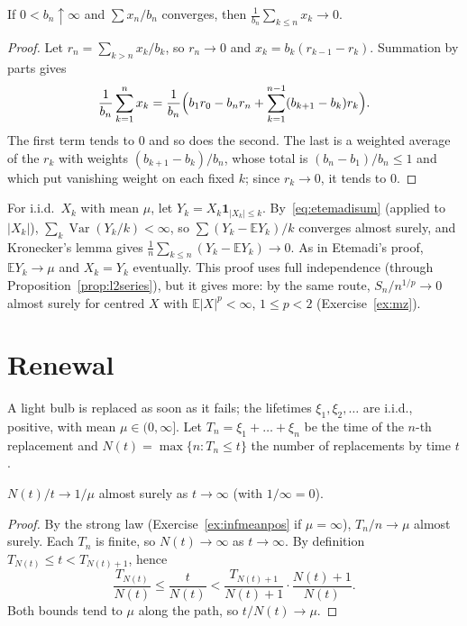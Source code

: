 \begin{lemma}[Kronecker]\label{lem:kronecker}
If $0<b_n\uparrow\infty$ and $\sum x_n/b_n$ converges, then $\frac1{b_n}\sum_{k\le n}x_k\to0$.
\end{lemma}
\begin{proof}
Let $r_n=\sum_{k>n}x_k/b_k$, so $r_n\to0$ and $x_k=b_k(r_{k-1}-r_k)$. Summation by parts gives
\[
\frac1{b_n}\sum_{k=1}^nx_k=\frac1{b_n}\Bigl(b_1r_0-b_nr_n+\sum_{k=1}^{n-1}(b_{k+1}-b_k)r_k\Bigr).
\]
The first term tends to $0$ and so does the second. The last is a weighted average of the $r_k$ with weights $(b_{k+1}-b_k)/b_n$, whose total is
$(b_n-b_1)/b_n\le1$ and which put vanishing weight on each fixed $k$; since $r_k\to0$, it tends to $0$.
\end{proof}

\begin{remark}
For i.i.d.\ $X_k$ with mean $\mu$, let $Y_k=X_k\mathbf 1_{|X_k|\le k}$. By~\eqref{eq:etemadisum} (applied to $|X_k|$), $\sum_k\operatorname{Var}(Y_k/k)<\infty$, so
$\sum(Y_k-\mathbb E Y_k)/k$ converges almost surely, and Kronecker's lemma gives $\frac1n\sum_{k\le n}(Y_k-\mathbb E Y_k)\to0$. As in Etemadi's proof,
$\mathbb E Y_k\to\mu$ and $X_k=Y_k$ eventually. This proof uses full independence (through Proposition~\ref{prop:l2series}), but it gives more: by the
same route, $S_n/n^{1/p}\to0$ almost surely for centred $X$ with $\mathbb E|X|^p<\infty$, $1\le p<2$ (Exercise~\ref{ex:mz}).
\end{remark}

\section{Renewal}

A light bulb is replaced as soon as it fails; the lifetimes $\xi_1,\xi_2,\dots$ are i.i.d., positive, with mean $\mu\in(0,\infty]$. Let
$T_n=\xi_1+\dots+\xi_n$ be the time of the $n$-th replacement and $N(t)=\max\{n:T_n\le t\}$ the number of replacements by time $t$.

\begin{theorem}\label{thm:renewal}
$N(t)/t\to1/\mu$ almost surely as $t\to\infty$ (with $1/\infty=0$).
\end{theorem}
\begin{proof}
By the strong law (Exercise~\ref{ex:infmeanpos} if $\mu=\infty$), $T_n/n\to\mu$ almost surely. Each $T_n$ is finite, so $N(t)\to\infty$ as
$t\to\infty$. By definition $T_{N(t)}\le t<T_{N(t)+1}$, hence
\[
\frac{T_{N(t)}}{N(t)}\le\frac t{N(t)}<\frac{T_{N(t)+1}}{N(t)+1}\cdot\frac{N(t)+1}{N(t)}.
\]
Both bounds tend to $\mu$ along the path, so $t/N(t)\to\mu$.
\end{proof}

